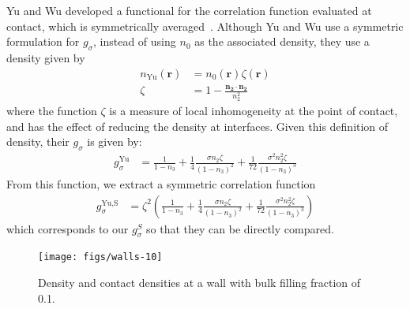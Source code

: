 \documentclass[letterpaper,twocolumn,amsmath,amssymb,jcp,10pt,aip]{revtex4-1}
\newcommand{\red}[1]{{\bf \color{red} #1}}
\newcommand{\rr}{\textbf{r}}
\newcommand{\fixme}[1]{\red{[#1]}}
\begin{document}
Yu and Wu developed a functional for the correlation function
evaluated at contact, which is symmetrically
averaged~\cite{yu2002fmt-dft-inhomogeneous-associating}.  Although Yu
and Wu use a symmetric formulation for $g_\sigma$, instead of using
$n_0$ as the associated density, they use a density given by
\begin{align}
  n_\text{Yu}(\rr) &= n_0(\rr) \zeta(\rr) \\
  \zeta &= 1 - \frac{\mathbf{n_2}\cdot\mathbf{n_2}}{n_2^2}
\end{align}
where the function $\zeta$ is a measure of local inhomogeneity at the
point of contact, and has the effect of reducing the density at
interfaces.  Given this definition of density, their $g_\sigma$ is
given by:
\begin{align}
  g_\sigma^\text{Yu} &= \frac{1}{1-n_3}
    + \frac14 \frac{\sigma n_2\zeta}{(1-n_3)^2}
    + \frac1{72} \frac{\sigma^2 n_2^2 \zeta}{(1-n_3)^3}
\end{align}
From this function, we extract a symmetric correlation function
\begin{align}
  g_\sigma^\text{Yu,S} &= \zeta^2\left(\frac{1}{1-n_3}
    + \frac14 \frac{\sigma n_2\zeta}{(1-n_3)^2}
    + \frac1{72} \frac{\sigma^2 n_2^2 \zeta}{(1-n_3)^3}\right)
\end{align}
which corresponds to our $g_\sigma^S$ so that they can be directly
compared.




\begin{figure}
  \texttt{[image: figs/walls-10]}
  \caption{Density and contact densities at a wall with bulk filling
    fraction of 0.1.}
  \label{fig:walls-10}
\end{figure}
\end{document}
